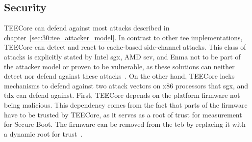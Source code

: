 \subsection{Security}
\label{eval:compare:security}
TEECore can defend against most attacks described in
chapter~\ref{sec:30:tee_attacker_model}. In contrast to other \gls{tee}
implementations, TEECore can detect and react to cache-based side-channel
attacks. This class of attacks is explicitly stated by Intel \gls{sgx}, AMD
\gls{sev}, and Enma not to be part of the attacker model or proven to be
vulnerable, as these solutions can neither detect nor defend against these
attacks~\cite{van2017sgx, kaplan_amd_2020, reitz_isolierende_2019}. On the other
hand, TEECore lacks mechanisms to defend against two attack vectors on x86
processors that \gls{sgx}, and \gls{tdx} can defend against. First,
TEECore depends on the platform firmware not being malicious. This dependency
comes from the fact that parts of the firmware have to be trusted by TEECore, as
it serves as a root of trust for measurement for Secure Boot. The firmware can
be removed from the \gls{tcb} by replacing it with a dynamic root for
trust~\cite{mccune_flicker_2008,amd_manual,intel_sdm}.\\

